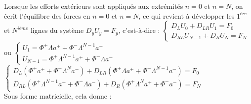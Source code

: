 \documentclass[12pt,a4paper]{article}
\begin{document}
\begin{enumerate}
		Lorsque les efforts extérieurs sont appliqués aux extrémités $n=0$ et $n=N$, on écrit l'équilibre des forces en $n=0$ et $n=N$, ce qui revient à développer les $1^{ère}$ et $N^{ième}$ lignes du système $D_yU_y = F_y$, c'est-à-dire : $\begin{cases}
			D_L U_0 + D_{LR} U_1 = F_0\\
			D_{RL}U_{N-1} + D_RU_N=F_N
		\end{cases}$ ou $\begin{cases}
		U_1 = \Phi^+\Lambda a^+ + \Phi^-\Lambda^{N-1}a^- \\
		U_{N-1} = \Phi^+\Lambda^{N-1}a^+ + \Phi^-\Lambda a^-
		\end{cases}$\\
		$\begin{cases}
			D_L(\Phi^+a^++\Phi^-\Lambda^Na^-)+D_{LR}(\Phi^+\Lambda a^+ + \Phi^-\Lambda^{N-1}a^-) = F_0\\
			D_{RL}(\Phi^+\Lambda^{N-1}a^+ + \Phi^-\Lambda a^-) + D_R(\Phi^+\Lambda^N a^++\Phi^-a^-) = F_N
		\end{cases}$\\
		Sous forme matricielle, cela donne :\\
	\end{enumerate}
	
	
	
	
	
	
	
	
	
	
	
	
	
	
	
	
	
	
	
	
	
	
	
	
	
	
	
	
	
\end{document}

